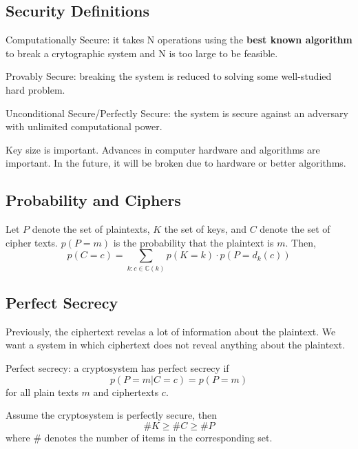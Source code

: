 \subsection{Security Definitions}
\begin{defn}
    Computationally Secure: it takes N operations using the \textbf{best known algorithm} to break a crytographic system and N is too large to be feasible.
\end{defn}

\begin{defn}
    Provably Secure: breaking the system is reduced to solving some well-studied hard problem.
\end{defn}

\begin{defn}
    Unconditional Secure/Perfectly Secure: the system is secure against an adversary with unlimited computational power.
\end{defn}

Key size is important. Advances in computer hardware and algorithms are important. In the future, it will be broken due to hardware or better algorithms.

\subsection{Probability and Ciphers}

\begin{defn}
Let $P$ denote the set of plaintexts, $K$ the set of keys, and $C$ denote the set of cipher texts. $p(P=m)$ is the probability that the plaintext is $m$. Then,
\[
p(C=c) = \sum_{k: c\in \mathbb{C}(k)} p(K=k)\cdot p(P=d_k(c))
\]
\end{defn}


\subsection{Perfect Secrecy}
Previously, the ciphertext revelas a lot of information about the plaintext. We want a system in which ciphertext does not reveal anything about the plaintext. 

\begin{defn}
    Perfect secrecy: a cryptosystem has perfect secrecy if \[ p(P=m | C=c) = p(P=m) \] for all plain texts $m$ and ciphertexts $c$.
\end{defn}

\begin{lem}
    Assume the cryptosystem is perfectly secure, then 
    \[ \#K \geq \#C \geq \#P\] where $\#$ denotes the number of items in the corresponding set. 
\end{lem}

